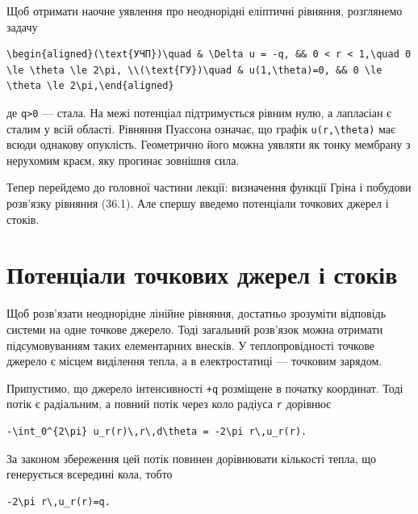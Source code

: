 \documentclass[
  ukrainian,
]{article}
\begin{document}
Щоб отримати наочне уявлення про неоднорідні еліптичні рівняння,
розглянемо задачу

\begin{verbatim}
\begin{aligned}(\text{УЧП})\quad & \Delta u = -q, && 0 < r < 1,\quad 0 \le \theta \le 2\pi, \\(\text{ГУ})\quad & u(1,\theta)=0, && 0 \le \theta \le 2\pi,\end{aligned}
\end{verbatim}

де \texttt{q\textgreater{}0} --- стала. На межі потенціал підтримується
рівним нулю, а лапласіан є сталим у всій області. Рівняння Пуассона
означає, що графік \texttt{u(r,\textbackslash{}theta)} має всюди
однакову опуклість. Геометрично його можна уявляти як тонку мембрану з
нерухомим краєм, яку прогинає зовнішня сила.

Тепер перейдемо до головної частини лекції: визначення функції Гріна і
побудови розв'язку рівняння (36.1). Але спершу введемо потенціали
точкових джерел і стоків.

\section{Потенціали точкових джерел і
стоків}\label{ux43fux43eux442ux435ux43dux446ux456ux430ux43bux438-ux442ux43eux447ux43aux43eux432ux438ux445-ux434ux436ux435ux440ux435ux43b-ux456-ux441ux442ux43eux43aux456ux432}

Щоб розв'язати неоднорідне лінійне рівняння, достатньо зрозуміти
відповідь системи на одне точкове джерело. Тоді загальний розв'язок
можна отримати підсумовуванням таких елементарних внесків. У
теплопровідності точкове джерело є місцем виділення тепла, а в
електростатиці --- точковим зарядом.

Припустимо, що джерело інтенсивності \texttt{+q} розміщене в початку
координат. Тоді потік є радіальним, а повний потік через коло радіуса
\texttt{r} дорівнює

\begin{verbatim}
-\int_0^{2\pi} u_r(r)\,r\,d\theta = -2\pi r\,u_r(r).
\end{verbatim}

За законом збереження цей потік повинен дорівнювати кількості тепла, що
генерується всередині кола, тобто

\begin{verbatim}
-2\pi r\,u_r(r)=q.
\end{verbatim}
\end{document}

